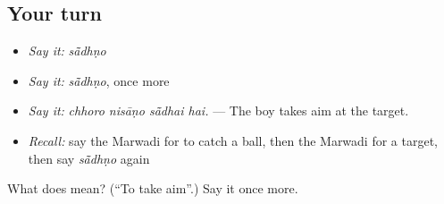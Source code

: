 \subsection*{Your turn}
\begin{itemize}
\raggedright
  \item \emph{Say it:} \emph{sā̃dhṇo}
  \item \emph{Say it:} \emph{sā̃dhṇo}, once more
  \item \emph{Say it:} \emph{chhoro nisāṇo sā̃dhai hai.} — The boy takes aim at the target.
  \item \emph{Recall:} say the Marwadi for to catch a ball, then the Marwadi for a target, then say \emph{sā̃dhṇo} again
\end{itemize}

\begin{tcolorbox}[breakable,colback=teal!4,colframe=teal!35!black,title={Before you move on}]
What does  mean? (\textquotedblleft{}To take aim\textquotedblright{}.) Say it once more.
\end{tcolorbox}
